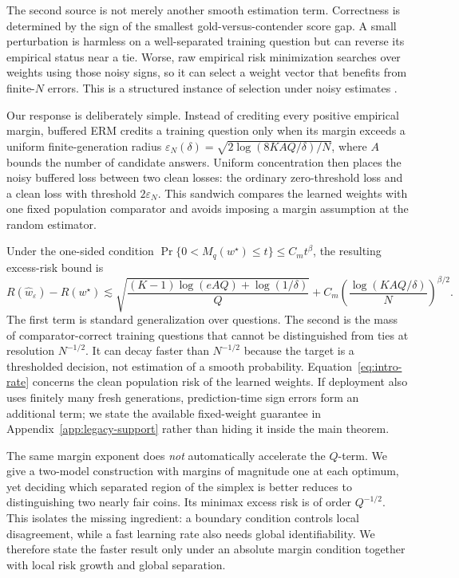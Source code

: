The second source is not merely another smooth estimation term.  Correctness is
determined by the sign of the smallest gold-versus-contender score gap.  A small
perturbation is harmless on a well-separated training question but can reverse
its empirical status near a tie.  Worse, raw empirical risk minimization
searches over weights using those noisy signs, so it can select a weight vector
that benefits from finite-\(N\) errors.  This is a structured instance of
selection under noisy estimates \citep{smith2006theoc}.

Our response is deliberately simple.  Instead of crediting every positive
empirical margin, buffered ERM credits a training question only when its margin
exceeds a uniform finite-generation radius
\(\varepsilon_N(\delta)=\sqrt{2\log(8KAQ/\delta)/N}\), where \(A\) bounds the
number of candidate answers.  Uniform concentration then places the noisy
buffered loss between two clean losses: the ordinary zero-threshold loss and a
clean loss with threshold \(2\varepsilon_N\).  This sandwich compares the
learned weights with one fixed population comparator and avoids imposing a
margin assumption at the random estimator.

Under the one-sided condition
\(\Pr\{0<M_q(w^\star)\le t\}\le C_m t^\beta\), the resulting excess-risk bound
is
\begin{equation}
R(\widehat w_\varepsilon)-R(w^\star)
\lesssim
\sqrt{\frac{(K-1)\log(eAQ)+\log(1/\delta)}{Q}}
+
C_m\left(\frac{\log(KAQ/\delta)}{N}\right)^{\beta/2}.
\label{eq:intro-rate}
\end{equation}
The first term is standard generalization over questions.  The second is the
mass of comparator-correct training questions that cannot be distinguished
from ties at resolution \(N^{-1/2}\).  It can decay faster than \(N^{-1/2}\)
because the target is a thresholded decision, not estimation of a smooth
probability.  Equation~\ref{eq:intro-rate} concerns the clean population risk
of the learned weights.  If deployment also uses finitely many fresh
generations, prediction-time sign errors form an additional term; we state the
available fixed-weight guarantee in Appendix~\ref{app:legacy-support} rather
than hiding it inside the main theorem.

The same margin exponent does \emph{not} automatically accelerate the
\(Q\)-term.  We give a two-model construction with margins of magnitude one at
each optimum, yet deciding which separated region of the simplex is better
reduces to distinguishing two nearly fair coins.  Its minimax excess risk is
of order \(Q^{-1/2}\).  This isolates the missing ingredient: a boundary
condition controls local disagreement, while a fast learning rate also needs
global identifiability.  We therefore state the faster result only under an
absolute margin condition together with local risk growth and global
separation.


